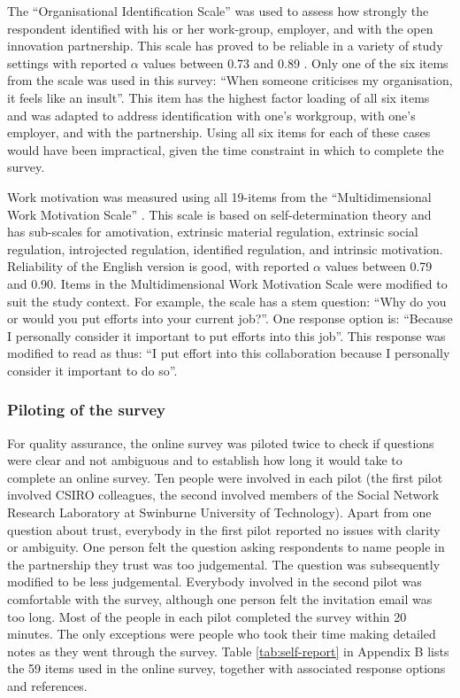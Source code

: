 The \enquote{Organisational Identification Scale} \citep{mael1992alumni} was used to assess how strongly the respondent identified with his or her work\hyp{}group, employer, and with the open innovation partnership. This scale has proved to be reliable in a variety of study settings with reported $\alpha$ values between 0.73 and 0.89 \citep{mael1992alumni,bergami2000self,knippenberg2000foci,van2008interactive}. Only one of the six items from the scale was used in this survey: \enquote{When someone criticises my organisation, it feels like an insult}. This item has the highest factor loading of all six items \citep{mael1992identifying} and was adapted to address identification with one's workgroup, with one's employer, and with the partnership. Using all six items for each of these cases would have been impractical, given the time constraint in which to complete the survey. \medskip

Work motivation was measured using all 19-items from the \enquote{Multidimensional Work Motivation Scale} \citep{gagne2015multidimensional}. This scale is based on self-determination theory and has sub-scales for amotivation, extrinsic material regulation, extrinsic social regulation, introjected regulation, identified regulation, and intrinsic motivation. Reliability of the English version is good, with reported $\alpha$ values between 0.79 and 0.90. Items in the Multidimensional Work Motivation Scale were modified to suit the study context. For example, the scale has a stem question: \enquote{Why do you or would you put efforts into your current job?}. One response option is: \enquote{Because I personally consider it important to put efforts into this job}. This response was modified to read as thus: \enquote{I put effort into this collaboration because I personally consider it important to do so}. 

\subsubsection{Piloting of the survey}

For quality assurance, the online survey was piloted twice to check if questions were clear and not ambiguous and to establish how long it would take to complete an online survey. Ten people were involved in each pilot (the first pilot involved CSIRO colleagues, the second involved members of the Social Network Research Laboratory at Swinburne University of Technology). Apart from one question about trust, everybody in the first pilot reported no issues with clarity or ambiguity. One person felt the question asking respondents to name people in the partnership they trust was too judgemental. The question was subsequently modified to be less judgemental. Everybody involved in the second pilot was comfortable with the survey, although one person felt the invitation email was too long. Most of the people in each pilot completed the survey within 20 minutes. The only exceptions were people who took their time making detailed notes as they went through the survey. Table \ref{tab:self-report} in Appendix B lists the 59 items used in the online survey, together with associated response options and references.

